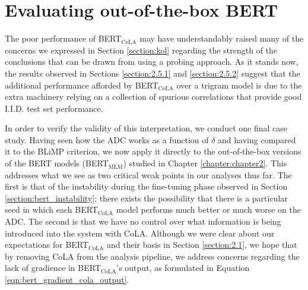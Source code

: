 \chapter{Evaluating out-of-the-box BERT}

The poor performance of BERT$_{\mathrm{CoLA}}$ may have understandably raised many of the concerns we expressed in Section \ref{section:kol} regarding the strength of the conclusions that can be drawn from using a probing approach.  As it stands now, the results observed in Sections \ref{section:2.5.1} and \ref{section:2.5.2} suggest that the additional performance afforded by BERT$_{\mathrm{CoLA}}$ over a trigram model is due to the extra machinery relying on a collection of spurious correlations that provide good I.I.D. test set performance.

In order to verify the validity of this interpretation, we conduct one final case study.  Having seen how the ADC works as a function of $\delta$ and having compared it to the BLiMP criterion, we now apply it directly to the out-of-the-box versions of the BERT models (BERT$_{\mathrm{MLM}}$) studied in Chapter \ref{chapter:chapter2}.  This addresses what we see as two critical weak points in our analyses thus far.  The first is that of the instability during the fine-tuning phase observed in Section \ref{section:bert_instability}; there exists the possibility that there is a particular seed in which each BERT$_{\mathrm{CoLA}}$ model performs much better or much worse on the ADC.  The second is that we have no control over what information is being introduced into the system with CoLA.  Although we were clear about our expectations for BERT$_{\mathrm{CoLA}}$ and their basis in Section \ref{section:2.1}, we hope that by removing CoLA from the analysis pipeline, we address concerns regarding the lack of gradience in BERT$_{\mathrm{CoLA}}$'s output, as formulated in Equation \ref{eqn:bert_gradient_cola_output}.

